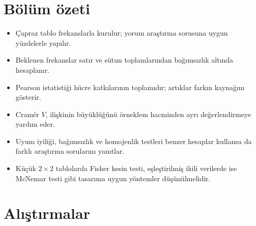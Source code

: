 \section{Bölüm özeti}

\begin{itemize}
  \item Çapraz tablo frekanslarla kurulur; yorum araştırma sorusuna uygun yüzdelerle yapılır.
  \item Beklenen frekanslar satır ve sütun toplamlarından bağımsızlık altında hesaplanır.
  \item Pearson istatistiği hücre katkılarının toplamıdır; artıklar farkın kaynağını gösterir.
  \item Cramér $V$, ilişkinin büyüklüğünü örneklem hacminden ayrı değerlendirmeye yardım eder.
  \item Uyum iyiliği, bağımsızlık ve homojenlik testleri benzer hesaplar
  kullansa da farklı araştırma sorularını yanıtlar.
  \item Küçük $2\times2$ tablolarda Fisher kesin testi, eşleştirilmiş ikili
  verilerde ise McNemar testi gibi tasarıma uygun yöntemler düşünülmelidir.
\end{itemize}


\section*{Alıştırmalar}

